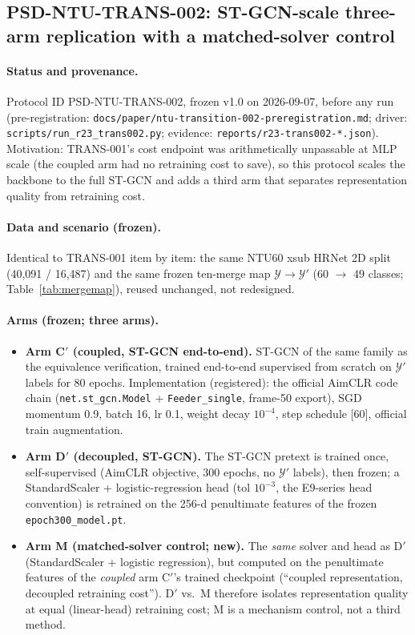 \documentclass[11pt,a4paper]{article}
\begin{document}
\subsection{PSD-NTU-TRANS-002: ST-GCN-scale three-arm replication with a matched-solver control}\label{app:trans002}

\paragraph{Status and provenance.}
Protocol ID PSD-NTU-TRANS-002, frozen v1.0 on 2026-09-07, before any run (pre-registration: \texttt{docs/paper/ntu-transition-002-preregistration.md}; driver: \texttt{scripts/run\_r23\_trans002.py}; evidence: \texttt{reports/r23-trans002-*.json}). Motivation: TRANS-001's cost endpoint was arithmetically unpassable at MLP scale (the coupled arm had no retraining cost to save), so this protocol scales the backbone to the full ST-GCN and adds a third arm that separates representation quality from retraining cost.

\paragraph{Data and scenario (frozen).}
Identical to TRANS-001 item by item: the same NTU60 xsub HRNet 2D split (40{,}091 / 16{,}487) and the same frozen ten-merge map $\mathcal{Y}\to\mathcal{Y}'$ (60 $\to$ 49 classes; Table~\ref{tab:mergemap}), reused unchanged, not redesigned.

\paragraph{Arms (frozen; three arms).}
\begin{itemize}
\item \textbf{Arm C$'$ (coupled, ST-GCN end-to-end).} ST-GCN of the same family as the equivalence verification, trained end-to-end supervised from scratch on $\mathcal{Y}'$ labels for 80 epochs. Implementation (registered): the official AimCLR code chain (\texttt{net.st\_gcn.Model} + \texttt{Feeder\_single}, frame-50 export), SGD momentum 0.9, batch 16, lr 0.1, weight decay $10^{-4}$, step schedule [60], official train augmentation.
\item \textbf{Arm D$'$ (decoupled, ST-GCN).} The ST-GCN pretext is trained once, self-supervised (AimCLR objective, 300 epochs, no $\mathcal{Y}'$ labels), then frozen; a StandardScaler + logistic-regression head (tol $10^{-3}$, the E9-series head convention) is retrained on the 256-d penultimate features of the frozen \texttt{epoch300\_model.pt}.
\item \textbf{Arm M (matched-solver control; new).} The \emph{same} solver and head as D$'$ (StandardScaler + logistic regression), but computed on the penultimate features of the \emph{coupled} arm C$'$'s trained checkpoint (``coupled representation, decoupled retraining cost''). D$'$ vs.\ M therefore isolates representation quality at equal (linear-head) retraining cost; M is a mechanism control, not a third method.
\end{itemize}
\end{document}
